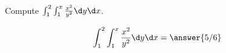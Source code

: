 \documentclass{ximera}
\author{David Guichard \and Neal Koblitz \and H. Jerome Keisler \and Albert Scheller \and Barry Balof \and Mike Wills \and Matthew Carr}
\begin{document}
\begin{exercise}




Compute $\int_{1}^{2}\int_{1}^{x}\frac{x^2}{y^2} \d y\d x$.
\begin{prompt}
\[
\int_{1}^{2}\int_{1}^{x}\frac{x^2}{y^2} \d y\d x=\answer{5/6}
\]
\end{prompt}



\end{exercise}
\end{document}
